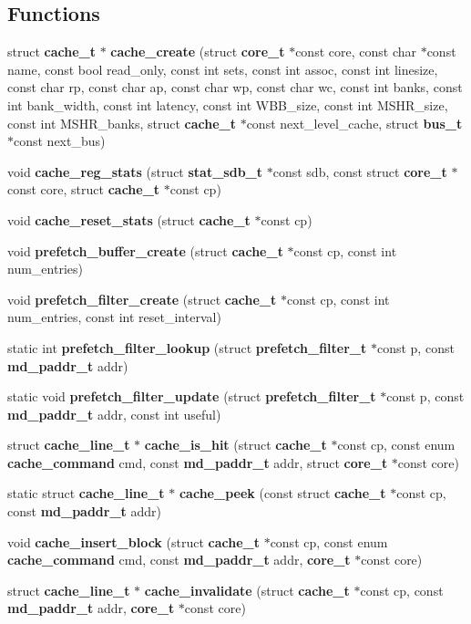 \subsection*{Functions}
\begin{CompactItemize}
\item 
struct {\bf cache\_\-t} $\ast$ {\bf cache\_\-create} (struct {\bf core\_\-t} $\ast$const core, const char $\ast$const name, const bool read\_\-only, const int sets, const int assoc, const int linesize, const char rp, const char ap, const char wp, const char wc, const int banks, const int bank\_\-width, const int latency, const int WBB\_\-size, const int MSHR\_\-size, const int MSHR\_\-banks, struct {\bf cache\_\-t} $\ast$const next\_\-level\_\-cache, struct {\bf bus\_\-t} $\ast$const next\_\-bus)
\item 
void {\bf cache\_\-reg\_\-stats} (struct {\bf stat\_\-sdb\_\-t} $\ast$const sdb, const struct {\bf core\_\-t} $\ast$const core, struct {\bf cache\_\-t} $\ast$const cp)
\item 
void {\bf cache\_\-reset\_\-stats} (struct {\bf cache\_\-t} $\ast$const cp)
\item 
void {\bf prefetch\_\-buffer\_\-create} (struct {\bf cache\_\-t} $\ast$const cp, const int num\_\-entries)
\item 
void {\bf prefetch\_\-filter\_\-create} (struct {\bf cache\_\-t} $\ast$const cp, const int num\_\-entries, const int reset\_\-interval)
\item 
static int {\bf prefetch\_\-filter\_\-lookup} (struct {\bf prefetch\_\-filter\_\-t} $\ast$const p, const {\bf md\_\-paddr\_\-t} addr)
\item 
static void {\bf prefetch\_\-filter\_\-update} (struct {\bf prefetch\_\-filter\_\-t} $\ast$const p, const {\bf md\_\-paddr\_\-t} addr, const int useful)
\item 
struct {\bf cache\_\-line\_\-t} $\ast$ {\bf cache\_\-is\_\-hit} (struct {\bf cache\_\-t} $\ast$const cp, const enum {\bf cache\_\-command} cmd, const {\bf md\_\-paddr\_\-t} addr, struct {\bf core\_\-t} $\ast$const core)
\item 
static struct {\bf cache\_\-line\_\-t} $\ast$ {\bf cache\_\-peek} (const struct {\bf cache\_\-t} $\ast$const cp, const {\bf md\_\-paddr\_\-t} addr)
\item 
void {\bf cache\_\-insert\_\-block} (struct {\bf cache\_\-t} $\ast$const cp, const enum {\bf cache\_\-command} cmd, const {\bf md\_\-paddr\_\-t} addr, {\bf core\_\-t} $\ast$const core)
\item 
struct {\bf cache\_\-line\_\-t} $\ast$ {\bf cache\_\-invalidate} (struct {\bf cache\_\-t} $\ast$const cp, const {\bf md\_\-paddr\_\-t} addr, {\bf core\_\-t} $\ast$const core)

\end{CompactItemize}
